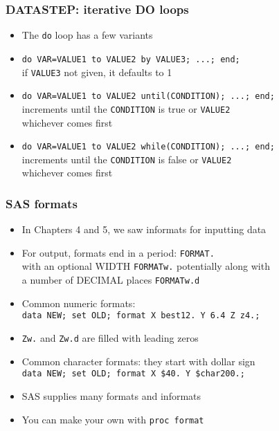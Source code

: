 \documentclass[11pt,pdftex,dvipsnames,usenames,helvetica]{beamer}
\begin{document}
\begin{frame}[fragile]
\frametitle{DATASTEP: iterative DO loops}
\begin{itemize}
\item The {\tt do} loop has a few variants
\item {\tt do VAR=VALUE1 to VALUE2 by VALUE3; ...; end;}\\
if {\tt VALUE3} not given, it defaults to 1
\item {\tt do VAR=VALUE1 to VALUE2 until(CONDITION); ...; end;}\\
  increments until the {\tt CONDITION} is true or {\tt VALUE2}\\
  whichever comes first
\item {\tt do VAR=VALUE1 to VALUE2 while(CONDITION); ...; end;}\\
  increments until the {\tt CONDITION} is false or {\tt VALUE2}\\
  whichever comes first
\end{itemize}
\end{frame}

\begin{frame}[fragile]
\frametitle{SAS formats}
\begin{itemize}
\item In Chapters 4 and 5, we saw informats for inputting data
\item For output, formats end in a period: {\tt FORMAT.}\\
with an optional WIDTH {\tt FORMATw.} potentially along with\\ 
a number of DECIMAL places {\tt FORMATw.d}
\item Common numeric formats:\\ 
{\tt data NEW; set OLD; format X best12.\ Y 6.4 Z z4.;}
\item {\tt Zw.} and {\tt Zw.d} are filled with leading zeros
\item Common character formats: they start with dollar sign\\ 
{\tt data NEW; set OLD; format X \$40.\ Y \$char200.;}
\item SAS supplies many formats and informats
\item You can make your own with {\tt proc format}
\end{itemize}
\end{frame}
\end{document}
